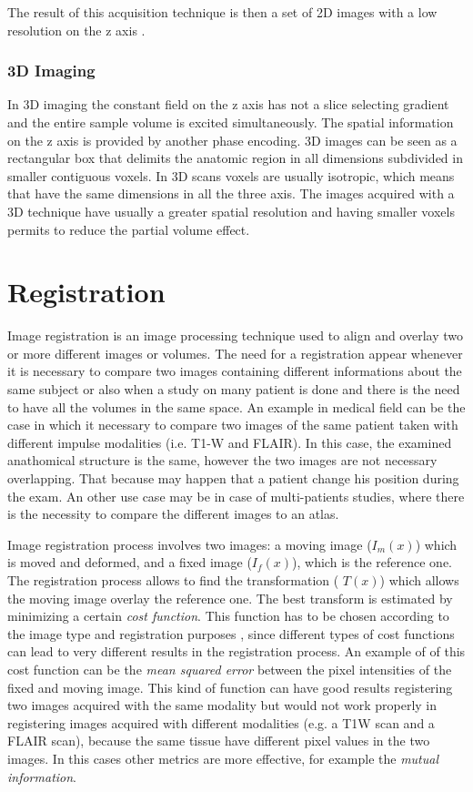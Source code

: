 \documentclass{standalone}
\begin{document}
The result of this acquisition technique is then a set of 2D images with a low resolution on the z axis \cite{ART:Martì}.

\subsubsection{3D Imaging}
In 3D imaging the constant field on the z axis has not a slice selecting gradient and the entire sample volume is excited simultaneously. The spatial information on the z axis is provided by another phase encoding.
3D images can be seen as a rectangular box that delimits the anatomic region in all dimensions subdivided in smaller contiguous voxels. In 3D scans voxels are usually isotropic, which means that have the same dimensions in all the three axis.
The images acquired with a 3D technique have usually a greater spatial resolution and having smaller voxels permits to reduce the partial volume effect.



\section{Registration}
Image registration is an image processing technique used to align and overlay two or more different images or volumes.
The need for a registration appear whenever it is necessary to compare two images containing different informations about the same subject \cite{ART:Junchi} or also when a study on many patient is done and there is the need to have all the volumes in the same space. An example in medical field can be the case in which it necessary to compare two images of the same patient taken with different impulse modalities (i.e. T1-W and FLAIR). In this case, the examined anathomical structure is the same, however the two images are not necessary overlapping. That because may happen that a patient change his position during the exam.   
An other use case may be in case of multi-patients studies, where there is the necessity to compare the different images to an atlas. 

Image registration process involves two images: a moving image ($I_m(x)$) which is moved and deformed, and a fixed image ($I_f(x)$), which is the reference one. The registration process allows to find the transformation ( $T(x)$) which allows the moving image overlay the reference one. The best transform is estimated by minimizing a certain \emph{cost function}. This function has to be chosen according to the image type and registration purposes \cite{ART:Elastix}, since different types of cost functions can lead to very different results in the registration process.
An example of of this cost function can be the \emph{mean squared error} between the pixel intensities of the fixed and moving image. This kind of function can have good results registering two images acquired with the same modality but would not work properly in registering images acquired with different modalities (e.g. a T1W scan and a FLAIR scan), because the same tissue have different pixel values in the two images.
In this cases other metrics are more effective, for example the \emph{mutual information}.
\end{document}
